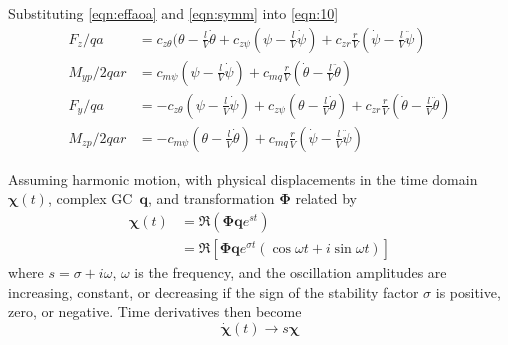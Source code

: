\documentclass[10pt,openany,twoside]{book}
\numberwithin{equation}{section}   %
\newcommand{\Matrix}[1]{\boldsymbol{#1}}
\newcommand{\Vector}[1]{\boldsymbol{#1}}
\newcommand{\Gc}{GC}
\begin{document}
Substituting \ref{eqn:effaoa} and \ref{eqn:symm} into \ref{eqn:10}
\begin{align}
\label{eqn:10a}
F_z/qa &= c_{z\theta}(\theta - \frac{l}{V}\dot{\theta} + c_{z\psi}(\psi - \frac{l}{V}\dot{\psi}) + c_{zr}\frac{r}{V}(\dot{\psi} - \frac{l}{V}\ddot{\psi}) \nonumber \\
M_{yp}/2qar &= c_{m\psi}(\psi - \frac{l}{V}\dot{\psi}) + c_{mq}\frac{r}{V}(\dot{\theta} - \frac{l}{V}\ddot{\theta}) \nonumber \\
F_y/qa &= -c_{z\theta}(\psi - \frac{l}{V}\dot{\psi}) + c_{z\psi}(\theta - \frac{l}{V}\dot{\theta}) + c_{zr}\frac{r}{V}(\dot{\theta} - \frac{l}{V}\ddot{\theta}) \nonumber \\
M_{zp}/2qar &= -c_{m\psi}(\theta - \frac{l}{V}\dot{\theta}) + c_{mq}\frac{r}{V}(\dot{\psi} - \frac{l}{V}\ddot{\psi})
\end{align}

Assuming harmonic motion, with physical displacements in the time domain $\Vector{\chi}(t)$,
complex \Gc\ $\Vector{q}$, and transformation $\Matrix{\Phi}$ related by
\begin{align} %
\Vector{\chi}(t) & =  \Re \left(\Matrix{\Phi}\Vector{q}e^{st}\right) \nonumber \\
              & =  \Re \left[\Matrix{\Phi}\Vector{q} e^{\sigma t}
				  		\left(\cos \omega t + i \sin \omega t \right) \right]	\nonumber
\end{align}
where $s = \sigma + i\omega$, $\omega$ is the frequency, and the
oscillation amplitudes are increasing, constant, or decreasing if the
sign of the stability factor $\sigma$ is positive, zero, or negative.
Time derivatives then become
\begin{equation}
\dot{\Vector{\chi}}(t) \rightarrow s\Vector{\chi}	\nonumber
\end{equation}
\end{document}

